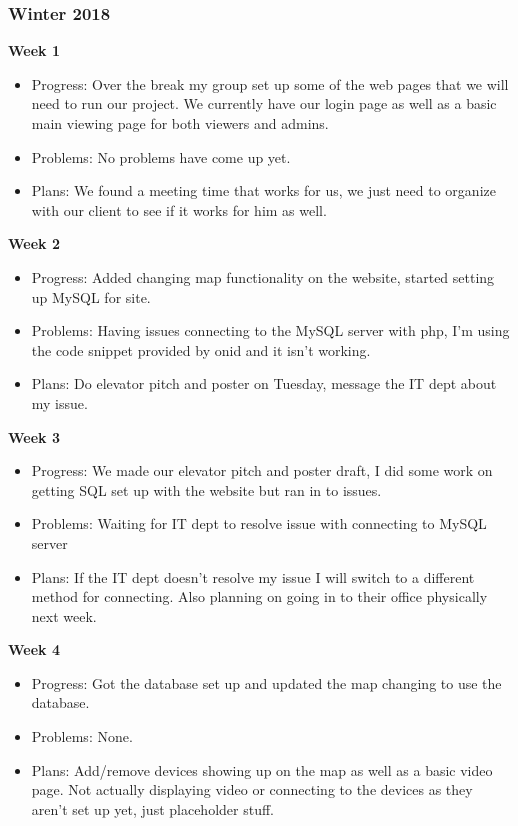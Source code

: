 \documentclass[onecolumn, draftclsnofoot,10pt, compsoc]{IEEEtran}
\begin{document}
    \subsubsection{Winter 2018}
        \textbf{Week 1}
        \begin{itemize}
            \item Progress: Over the break my group set up some of the web pages that we will need to run our project. We currently have our login page as well as a basic main viewing page for both viewers and admins.

            \item Problems: No problems have come up yet.

            \item Plans: We found a meeting time that works for us, we just need to organize with our client to see if it works for him as well.
        \end{itemize}
        \textbf{Week 2}
        \begin{itemize}
            \item Progress: Added changing map functionality on the website, started setting up MySQL for site.

            \item Problems: Having issues connecting to the MySQL server with php, I'm using the code snippet provided by onid and it isn't working.

            \item Plans: Do elevator pitch and poster on Tuesday, message the IT dept about my issue.
        \end{itemize}
        \newpage
        \textbf{Week 3}
        \begin{itemize}
            \item Progress: We made our elevator pitch and poster draft, I did some work on getting SQL set up with the website but ran in to issues.

            \item Problems: Waiting for IT dept to resolve issue with connecting to MySQL server

            \item Plans: If the IT dept doesn't resolve my issue I will switch to a different method for connecting. Also planning on going in to their office physically next week.
        \end{itemize}
        \textbf{Week 4}
        \begin{itemize}
            \item Progress: Got the database set up and updated the map changing to use the database.

            \item Problems: None.

            \item Plans: Add/remove devices showing up on the map as well as a basic video page. Not actually displaying video or connecting to the devices as they aren't set up yet, just placeholder stuff.
        \end{itemize}
\end{document}
